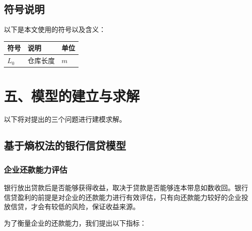 \documentclass{my_paper}
\begin{document}
\subsection{符号说明}
以下是本文使用的符号以及含义：
\begin{table}[h]%
    \centering
    \begin{tabular}{p{2.0cm}<{\centering}p{9.0cm}<{\centering}p{2.0cm}<{\centering}}
    \hline
    符号 & 说明 & 单位 \\ %
    \hline
    $L_0$ & 仓库长度 &  $m$\\
    
    \hline
    \end{tabular}
\end{table}

\section{五、模型的建立与求解}

以下将对提出的三个问题进行建模求解。
\subsection{基于熵权法的银行信贷模型}
\subsubsection{企业还款能力评估}
银行放出贷款后是否能够获得收益，取决于贷款是否能够连本带息如数收回。银行信贷盈利的前提是对企业的还款能力进行有效评估，只有向还款能力较好的企业投放信贷，才会有较低的风险，保证收益来源。

为了衡量企业的还款能力，我们提出以下指标：
\end{document}
